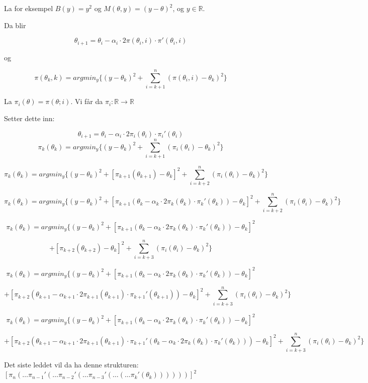\documentclass[11pt]{article}
\begin{document}
La for eksempel \(B(y) = y^2\) og \(M(\theta, y) = (y - \theta)^2\), og \(y \in \mathbb{R}\).

Da blir

\[\theta_{i+1} = \theta_i - \alpha_i \cdot 2\pi(\theta_i, i) \cdot \pi'(\theta_i, i)\]

og

\[
    \pi(\theta_k, k) = argmin_{y} \{(y - \theta_k)^2 + \sum_{i=k+1}^{n} (\pi(\theta_i, i) - \theta_k)^2\}
\]

La \(\pi_i(\theta) = \pi(\theta; i)\).
Vi får da \(\pi_i \colon \mathbb{R} \longrightarrow \mathbb{R}\)

Setter dette inn:

\[\theta_{i+1} = \theta_i - \alpha_i \cdot 2\pi_i(\theta_i) \cdot \pi_i'(\theta_i)\]
\[
    \pi_k(\theta_k) = argmin_{y} \{(y - \theta_k)^2 + \sum_{i=k+1}^{n} (\pi_i(\theta_i) - \theta_k)^2\}
\]

\[
    \pi_k(\theta_k) = argmin_{y} \{(y - \theta_k)^2 + [\pi_{k+1}(\theta_{k+1}) - \theta_k]^2 + \sum_{i=k+2}^{n} (\pi_i(\theta_i) - \theta_k)^2\}
\]

\[
    \pi_k(\theta_k) = argmin_{y} \{(y - \theta_k)^2 + [\pi_{k+1}(\theta_k - \alpha_k \cdot 2\pi_k(\theta_k) \cdot \pi_k'(\theta_k)) - \theta_k]^2 + \sum_{i=k+2}^{n} (\pi_i(\theta_i) - \theta_k)^2\}
\]

\[
    \pi_k(\theta_k) = argmin_{y} \{(y - \theta_k)^2 + [\pi_{k+1}(\theta_k - \alpha_k \cdot 2\pi_k(\theta_k) \cdot \pi_k'(\theta_k)) - \theta_k]^2
\]

\[+ [\pi_{k+2}(\theta_{k+2}) - \theta_k]^2 + \sum_{i=k+3}^{n} (\pi_i(\theta_i) - \theta_k)^2\}
\]

\[
    \pi_k(\theta_k) = argmin_{y} \{(y - \theta_k)^2 + [\pi_{k+1}(\theta_k - \alpha_k \cdot 2\pi_k(\theta_k) \cdot \pi_k'(\theta_k)) - \theta_k]^2
\]

\[+ [\pi_{k+2}(\theta_{k+1} - \alpha_{k+1} \cdot 2\pi_{k+1}(\theta_{k+1}) \cdot \pi_{k+1}'(\theta_{k+1})) - \theta_k]^2 + \sum_{i=k+3}^{n} (\pi_i(\theta_i) - \theta_k)^2\}
\]

\[
    \pi_k(\theta_k) = argmin_{y} \{(y - \theta_k)^2 + [\pi_{k+1}(\theta_k - \alpha_k \cdot 2\pi_k(\theta_k) \cdot \pi_k'(\theta_k)) - \theta_k]^2
\]

\[+ [\pi_{k+2}(\theta_{k+1} - \alpha_{k+1} \cdot 2\pi_{k+1}(\theta_{k+1}) \cdot \pi_{k+1}'(\theta_k - \alpha_k \cdot 2\pi_k(\theta_k) \cdot \pi_k'(\theta_k))) - \theta_k]^2 + \sum_{i=k+3}^{n} (\pi_i(\theta_i) - \theta_k)^2\}
\]

Det siste leddet vil da ha denne strukturen: \([\pi_n(\dots\pi_{n-1}'(\dots\pi_{n-2}'(\dots\pi_{n-3}'(\dots(\dots\pi_k'(\theta_k))))))]^2\)
\end{document}
